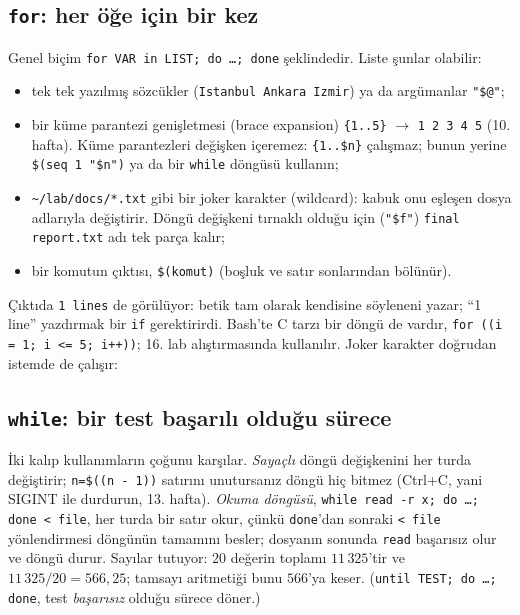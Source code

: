 \subsection{\texttt{for}: her öğe için bir kez}




Genel biçim \texttt{for VAR in LIST; do \ldots; done} şeklindedir. Liste şunlar olabilir:
\begin{itemize}
  \item tek tek yazılmış sözcükler (\texttt{Istanbul Ankara Izmir}) ya da argümanlar \texttt{"\$@"};
  \item bir küme parantezi genişletmesi (brace expansion) \texttt{\{1..5\}} $\to$ \texttt{1 2 3 4 5} (10. hafta). Küme parantezleri değişken içeremez: \texttt{\{1..\$n\}} çalışmaz; bunun yerine \texttt{\$(seq 1 "\$n")} ya da bir \texttt{while} döngüsü kullanın;
  \item \texttt{\textasciitilde/lab/docs/*.txt} gibi bir joker karakter (wildcard): kabuk onu eşleşen dosya adlarıyla değiştirir. Döngü değişkeni tırnaklı olduğu için (\texttt{"\$f"}) \texttt{final report.txt} adı tek parça kalır;
  \item bir komutun çıktısı, \texttt{\$(komut)} (boşluk ve satır sonlarından bölünür).
\end{itemize}
Çıktıda \texttt{1 lines} de görülüyor: betik tam olarak kendisine söyleneni yazar; “1 line” yazdırmak bir \texttt{if} gerektirirdi. Bash'te C tarzı bir döngü de vardır, \texttt{for ((i = 1; i <= 5; i++))}; 16. lab alıştırmasında kullanılır. Joker karakter doğrudan istemde de çalışır:


\subsection{\texttt{while}: bir test başarılı olduğu sürece}




İki kalıp kullanımların çoğunu karşılar. \emph{Sayaçlı} döngü değişkenini her turda değiştirir; \texttt{n=\$((n - 1))} satırını unutursanız döngü hiç bitmez (Ctrl+C, yani SIGINT ile durdurun, 13. hafta). \emph{Okuma döngüsü}, \texttt{while read -r x; do \ldots; done < file}, her turda bir satır okur, çünkü \texttt{done}'dan sonraki \texttt{< file} yönlendirmesi döngünün tamamını besler; dosyanın sonunda \texttt{read} başarısız olur ve döngü durur. Sayılar tutuyor: $20$ değerin toplamı $11\,325$'tir ve $11\,325 / 20 = 566{,}25$; tamsayı aritmetiği bunu $566$'ya keser. (\texttt{until TEST; do \ldots; done}, test \emph{başarısız} olduğu sürece döner.)

